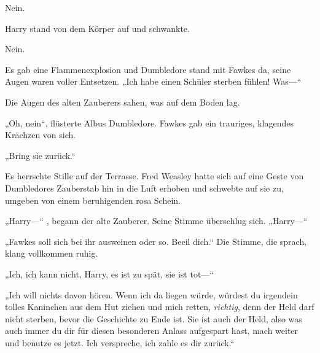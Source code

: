 Nein.

Harry stand von dem Körper auf und schwankte.

Nein.

Es gab eine Flammenexplosion und Dumbledore stand mit Fawkes da, seine Augen waren voller Entsetzen. „Ich habe einen Schüler sterben fühlen! Was—“

Die Augen des alten Zauberers sahen, was auf dem Boden lag.

„Oh, nein“, flüsterte Albus Dumbledore. Fawkes gab ein trauriges, klagendes Krächzen von sich.

„Bring sie zurück.“

Es herrschte Stille auf der Terrasse. Fred Weasley hatte sich auf eine Geste von Dumbledores Zauberstab hin in die Luft erhoben und schwebte auf sie zu, umgeben von einem beruhigenden rosa Schein.

„Harry—“ , begann der alte Zauberer. Seine Stimme überschlug sich. „Harry—“

„Fawkes soll sich bei ihr ausweinen oder so. Beeil dich.“
Die Stimme, die sprach, klang vollkommen ruhig.

„Ich, ich kann nicht, Harry, es ist zu spät, sie ist tot—“

„Ich will nichts davon hören. Wenn ich da liegen würde, würdest du irgendein tolles Kaninchen aus dem Hut ziehen und mich retten, \emph{richtig}, denn der Held darf nicht sterben, bevor die Geschichte zu Ende ist. Sie ist auch der Held, also was auch immer du dir für diesen besonderen Anlass aufgespart hast, mach weiter und benutze es jetzt. Ich verspreche, ich zahle es dir zurück.“

